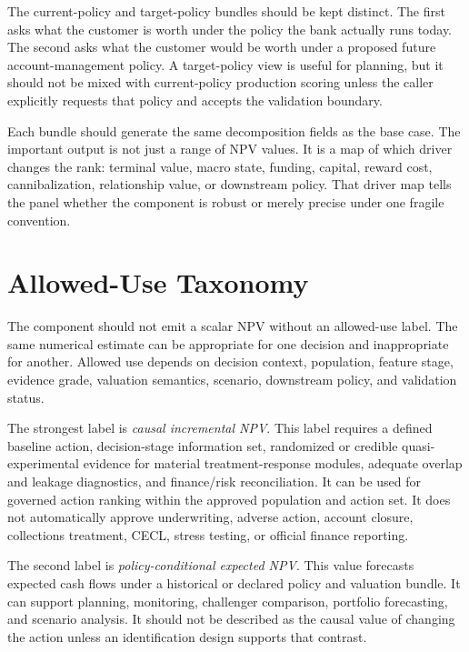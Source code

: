 \documentclass[11pt]{article}
\newcommand{\1}{\mathbf{1}}
\begin{document}
The current-policy and target-policy bundles should be kept distinct. The
first asks what the customer is worth under the policy the bank actually runs
today. The second asks what the customer would be worth under a proposed
future account-management policy. A target-policy view is useful for planning,
but it should not be mixed with current-policy production scoring unless the
caller explicitly requests that policy and accepts the validation boundary.

Each bundle should generate the same decomposition fields as the base case.
The important output is not just a range of NPV values. It is a map of which
driver changes the rank: terminal value, macro state, funding, capital,
reward cost, cannibalization, relationship value, or downstream policy. That
driver map tells the panel whether the component is robust or merely precise
under one fragile convention.

\section{Allowed-Use Taxonomy}
\label{sec:allowed-use-taxonomy}

The component should not emit a scalar NPV without an allowed-use label. The
same numerical estimate can be appropriate for one decision and inappropriate
for another. Allowed use depends on decision context, population, feature
stage, evidence grade, valuation semantics, scenario, downstream policy, and
validation status.

The strongest label is \emph{causal incremental NPV}. This label requires a
defined baseline action, decision-stage information set, randomized or credible
quasi-experimental evidence for material treatment-response modules, adequate
overlap and leakage diagnostics, and finance/risk reconciliation. It can be
used for governed action ranking within the approved population and action
set. It does not automatically approve underwriting, adverse action, account
closure, collections treatment, CECL, stress testing, or official finance
reporting.

The second label is \emph{policy-conditional expected NPV}. This value
forecasts expected cash flows under a historical or declared policy and
valuation bundle. It can support planning, monitoring, challenger comparison,
portfolio forecasting, and scenario analysis. It should not be described as
the causal value of changing the action unless an identification design
supports that contrast.
\end{document}

